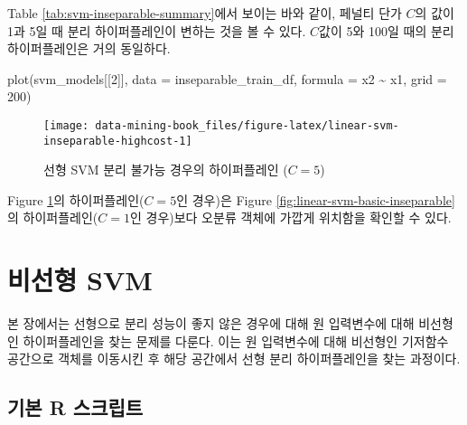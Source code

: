 \documentclass[
]{book}
\newenvironment{Shaded}{\begin{snugshade}}{\end{snugshade}}
\newcommand{\AttributeTok}[1]{\textcolor[rgb]{0.77,0.63,0.00}{#1}}
\newcommand{\DecValTok}[1]{\textcolor[rgb]{0.00,0.00,0.81}{#1}}
\newcommand{\FunctionTok}[1]{\textcolor[rgb]{0.00,0.00,0.00}{#1}}
\newcommand{\NormalTok}[1]{#1}
\newcommand{\SpecialCharTok}[1]{\textcolor[rgb]{0.00,0.00,0.00}{#1}}
\begin{document}
Table \ref{tab:svm-inseparable-summary}에서 보이는 바와 같이, 페널티 단가 \(C\)의 값이 1과 5일 때 분리 하이퍼플레인이 변하는 것을 볼 수 있다. \(C\)값이 5와 100일 때의 분리 하이퍼플레인은 거의 동일하다.

\begin{Shaded}
\begin{Highlighting}[]
\FunctionTok{plot}\NormalTok{(svm\_models[[}\DecValTok{2}\NormalTok{]], }\AttributeTok{data =}\NormalTok{ inseparable\_train\_df, }\AttributeTok{formula =}\NormalTok{ x2 }\SpecialCharTok{\textasciitilde{}}\NormalTok{ x1, }\AttributeTok{grid =} \DecValTok{200}\NormalTok{)}
\end{Highlighting}
\end{Shaded}

\begin{figure}

{\centering \texttt{[image: data-mining-book\_files/figure-latex/linear-svm-inseparable-highcost-1]} 

}

\caption{선형 SVM 분리 불가능 경우의 하이퍼플레인 ($C = 5$)}\label{fig:linear-svm-inseparable-highcost}
\end{figure}

Figure \ref{fig:linear-svm-inseparable-highcost}의 하이퍼플레인(\(C = 5\)인 경우)은 Figure \ref{fig:linear-svm-basic-inseparable}의 하이퍼플레인(\(C = 1\)인 경우)보다 오분류 객체에 가깝게 위치함을 확인할 수 있다.

\hypertarget{nonlinear-svm}{%
\section{비선형 SVM}\label{nonlinear-svm}}

본 장에서는 선형으로 분리 성능이 좋지 않은 경우에 대해 원 입력변수에 대해 비선형인 하이퍼플레인을 찾는 문제를 다룬다. 이는 원 입력변수에 대해 비선형인 기저함수 공간으로 객체를 이동시킨 후 해당 공간에서 선형 분리 하이퍼플레인을 찾는 과정이다.

\hypertarget{nonlinear-svm-basic-script}{%
\subsection{기본 R 스크립트}\label{nonlinear-svm-basic-script}}
\end{document}
